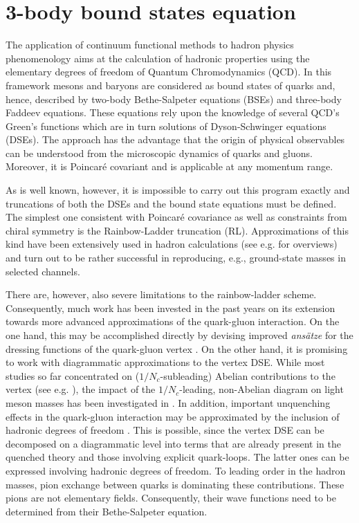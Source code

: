 \chapter{3-body bound states equation}
\label{chap:fadeev}

The application of continuum functional methods to hadron physics phenomenology aims at the calculation of hadronic properties using the elementary degrees of freedom of Quantum Chromodynamics (QCD). In this framework mesons and baryons are considered as bound states of quarks and, hence, described by two-body Bethe-Salpeter equations (BSEs) and three-body Faddeev equations. These equations rely upon the knowledge of several QCD's Green's functions which are in turn solutions of Dyson-Schwinger equations (DSEs). The approach has the advantage that the origin of physical observables can be understood from the microscopic dynamics of quarks and gluons. Moreover, it is Poincar\'e covariant and is applicable at any momentum range.

As is well known, however, it is impossible to carry out this program exactly and truncations of both the DSEs and the bound state equations must be defined. The simplest one consistent with Poincar\'e covariance as well as constraints from chiral symmetry is the Rainbow-Ladder truncation (RL). Approximations of this kind have been extensively used in hadron calculations (see e.g. \cite{Eichmann:2013afa,Bashir:2012fs} for overviews) and turn out to be rather successful in reproducing, e.g., ground-state masses 
in selected channels.

There are, however, also severe limitations to the 
rainbow-ladder scheme. Consequently, much work has been 
invested in the past years on its extension towards more 
advanced approximations of the quark-gluon interaction. 
On the one hand, this may be accomplished directly by devising
improved \textit{ans\"atze} for the dressing functions of the 
quark-gluon vertex 
\cite{Fischer:2005en,Chang:2009zb,Chang:2010hb,heupel_new}.
On the other hand, it is promising to work with diagrammatic
approximations to the vertex DSE. While most studies so far concentrated 
on ($1/N_c$-subleading) Abelian contributions to the vertex (see e.g. 
\cite{Bender:1996bb,Watson:2004kd,Watson:2004jq,Bhagwat:2004hn,Matevosyan:2006bk}),
the impact of the $1/N_c$-leading, non-Abelian diagram on light meson
masses has been investigated in \cite{Fischer:2009jm}. In addition,
important unquenching effects in the quark-gluon interaction may 
be approximated by the inclusion of hadronic degrees 
of freedom \cite{Fischer:2007ze,Fischer:2008sp,Fischer:2008wy}. 
This is possible, since the vertex DSE can be decomposed on a diagrammatic
level into terms that are already present in the quenched theory and those 
involving explicit quark-loops. The latter ones can be expressed involving  
hadronic degrees of freedom. To leading order in the hadron masses, pion 
exchange between quarks is dominating these contributions. These pions are 
not elementary fields. Consequently, their wave functions need to be determined 
from their Bethe-Salpeter equation. 

